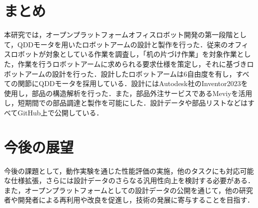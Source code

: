 \section{まとめ}
本研究では，オープンプラットフォームオフィスロボット開発の第一段階として，QDDモータを用いたロボットアームの設計と製作を行った．従来のオフィスロボットが対象としている作業を調査し，「机の片づけ作業」を対象作業とした，作業を行うロボットアームに求められる要求仕様を策定し，それに基づきロボットアームの設計を行った．設計したロボットアームは6自由度を有し，すべての関節にQDDモータを採用している．設計にはAutodesk社のInventor2023を使用し，部品の構造解析を行った．また，部品外注サービスであるMeviyを活用し，短期間での部品調達と製作を可能にした．設計データや部品リストなどはすべてGitHub上で公開している．

\section{今後の展望}
今後の課題として，動作実験を通じた性能評価の実施，他のタスクにも対応可能な仕様拡張，さらには設計データのさらなる汎用性向上を検討する必要がある．また，オープンプラットフォームとしての設計データの公開を通じて，他の研究者や開発者による再利用や改良を促進し，技術の発展に寄与することを目指す．
\newpage